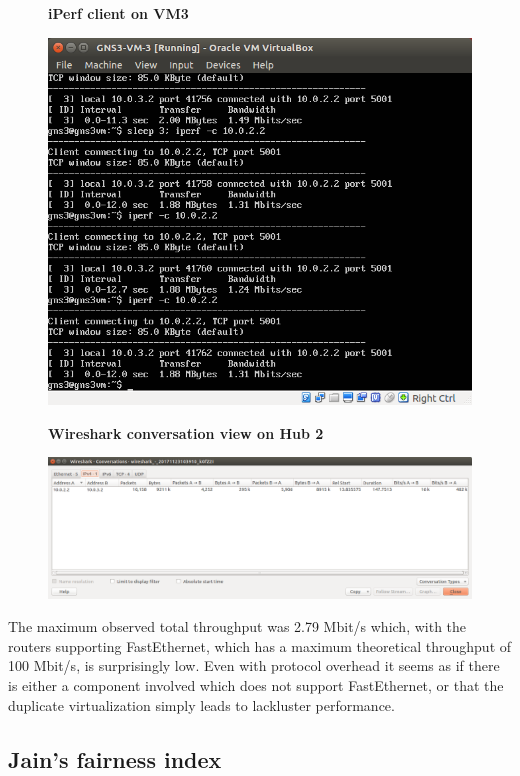 \documentclass[a4paper]{scrreprt}
\begin{document}
\begin{figure}
    \centering
    \textbf{iPerf client on VM3}\par\medskip
    \includegraphics[width=\textwidth]{resources/iperf_vm3.png}
\end{figure}

\begin{figure}
    \centering
    \textbf{Wireshark conversation view on Hub 2}\par\medskip
    \includegraphics[width=\textwidth]{resources/hub_2_conversation.png}
\end{figure}

The maximum observed total throughput was 2.79 Mbit/s which, with the routers
supporting FastEthernet, which has a maximum theoretical throughput of 100
Mbit/s, is surprisingly low. Even with protocol overhead it seems as if there
is either a component involved which does not support FastEthernet, or that the
duplicate virtualization simply leads to lackluster performance.

\subsection{Jain's fairness index}
\end{document}

